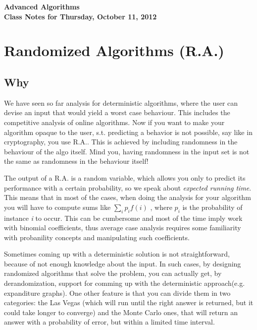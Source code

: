 \documentclass[11pt]{article}
\begin{document}
\begin{center}
  \LARGE\bf Advanced Algorithms\\

  \Large\sf
  Class Notes for Thursday, October 11, 2012\\

  \it

\end{center}

\bigskip


\section{Randomized Algorithms (R.A.)}
\subsection{Why }
We have seen so far analysis for deterministic algorithms, where the user can devise an input that would yield a worst case behaviour. This includes the competitive analysis of online algorithms. Now if you want to make your algorithm opaque to the user, s.t. predicting a behavior is not possible, say like in cryptography, you use R.A.. This is achieved by including randomness in the behaviour of the algo itself. Mind you, having randomness in the input set is not the same as randomness in the behaviour itself! 

The output of a R.A. is a random variable, which allows you only to predict its performance with a certain probability, so we speak about \textit{expected running time}. This means that in most of the cases, when doing the analysis for your algorithm you will have to compute sums like $\sum_i{p_{i}f(i)}$ , where $p_i$ is the probability of instance \textit{i} to occur. This can be cumbersome and most of the time imply work with binomial coefficients, thus average case analysis requires some familiarity with probanility concepts and manipulating such coefficients. 

Sometimes coming up with a deterministic solution is not straightforward, because of not enough knowledge about the input. In such cases, by designing randomized algorithms that solve the problem, you can actually get, by derandomization, support for comming up with the deterministic approach(e.g. expanditure graphs). One other feature is that you can divide them in two categories: the Las Vegas (which will run until the right answer is returned, but it could take longer to converge) and the Monte Carlo ones, that will return an answer with a probability of error, but within a limited time interval.
\end{document}
